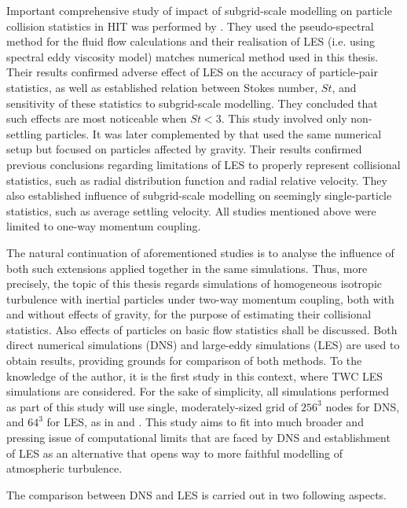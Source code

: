 \documentclass{pracamgren}
\begin{document}
Important comprehensive study of impact of subgrid-scale modelling on particle collision statistics in HIT was performed by \textcite{Jin2010}.
They used the pseudo-spectral method for the fluid flow calculations and their realisation of LES (i.e. using spectral eddy viscosity model) matches numerical method used in this thesis.
Their results confirmed adverse effect of LES on the accuracy of particle-pair statistics, as well as established relation between Stokes number, $St$, and sensitivity of these statistics to subgrid-scale modelling.
They concluded that such effects are most noticeable when $St < 3$.
This study involved only non-settling particles.
It was later complemented by \textcite{Rosa2017} that used the same numerical setup but focused on particles affected by gravity.
Their results confirmed previous conclusions regarding limitations of LES to properly represent collisional statistics, such as radial distribution function and radial relative velocity.
They also established influence of subgrid-scale modelling on seemingly single-particle statistics, such as average settling velocity.
All studies mentioned above were limited to one-way momentum coupling.

\smallskip

The natural continuation of aforementioned studies is to analyse the influence of both such extensions applied together in the same simulations.
Thus, more precisely, the topic of this thesis regards simulations of homogeneous isotropic turbulence with inertial particles under two-way momentum coupling, both with and without effects of gravity, for the purpose of estimating their collisional statistics.
Also effects of particles on basic flow statistics shall be discussed.
Both direct numerical simulations (DNS) and large-eddy simulations (LES) are used to obtain results, providing grounds for comparison of both methods.
To the knowledge of the author, it is the first study in this context, where TWC LES simulations are considered.
For the sake of simplicity, all simulations performed as part of this study will use single, moderately-sized grid of $256^3$ nodes for DNS, and $64^3$ for LES, as in \textcite{Jin2010} and \textcite{Rosa2017}.
This study aims to fit into much broader and pressing issue of computational limits that are faced by DNS and establishment of LES as an alternative that opens way to more faithful modelling of atmospheric turbulence.

\smallskip

The comparison between DNS and LES is carried out in two following aspects.
\end{document}
